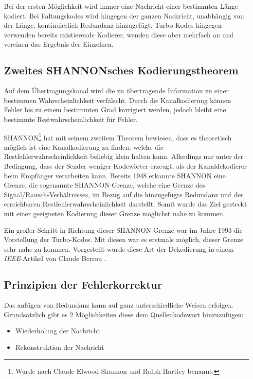 Bei der ersten Möglichkeit wird immer eine Nachricht einer bestimmten Länge kodiert. Bei Faltungskodes wird hingegen der ganzen Nachricht, unabhängig von der Länge, kontinuierlich Redundanz hinzugefügt. Turbo-Kodes hingegen verwenden bereits existierende Kodierer, wenden diese aber mehrfach an und vereinen das Ergebnis der Einzelnen.

\subsection{Zweites SHANNONsches Kodierungstheorem}
\label{sec:shannonTheorem}
Auf dem Übertragungskanal wird die zu übertragende Information zu einer bestimmen Wahrscheinlichkeit verfälscht. Durch die Kanalkodierung können Fehler bis zu einem bestimmten Grad korrigiert werden, jedoch bleibt eine bestimmte Restwahrscheinlichkeit für Fehler.

SHANNON\footnote{Wurde nach Claude Elwood Shannon und Ralph Hartley benannt.} hat mit seinem zweitem Theorem bewiesen, dass es theoretisch möglich ist eine Kanalkodierung zu finden, welche die Restfehlerwahrscheinlichkeit beliebig klein halten kann. Allerdings nur unter der Bedingung, dass der Sender weniger Kodewörter erzeugt, als der Kanaldekodierer beim Empfänger verarbeiten kann. Bereits 1948 erkannte SHANNON eine Grenze, die sogenannte SHANNON-Grenze, welche eine Grenze des Signal/Rausch-Verhältnisses, im Bezug auf die hinzugefügte Redundanz und der erreichbaren Restfehlerwahrscheinlichkeit darstellt. Somit wurde das Ziel gesteckt mit einer geeigneten Kodierung dieser Grenze möglichst nahe zu kommen. \cite[S.~125~f.]{schoenfeld2012informations}

Ein großer Schritt in Richtung dieser SHANNON-Grenze war im Jahre 1993 die Vorstellung der Turbo-Kodes. Mit diesen war es erstmals möglich, dieser Grenze sehr nahe zu kommen. Vorgestellt wurde diese Art der Dekodierung in einem \emph{IEEE}-Artikel von Claude Berrou \cite{berrou1996near}.

\subsection{Prinzipien der Fehlerkorrektur}
\label{sec:principlesMistakesCorrection}
Das anfügen von Redundanz kann auf ganz unterschiedliche Weisen erfolgen. Grundsätzlich gibt es 2 Möglichkeiten diese dem Quellenkodewort hinzuzufügen:

\begin{itemize}
\item Wiederholung der Nachricht
\item Rekonstruktion der Nachricht
\end{itemize}

